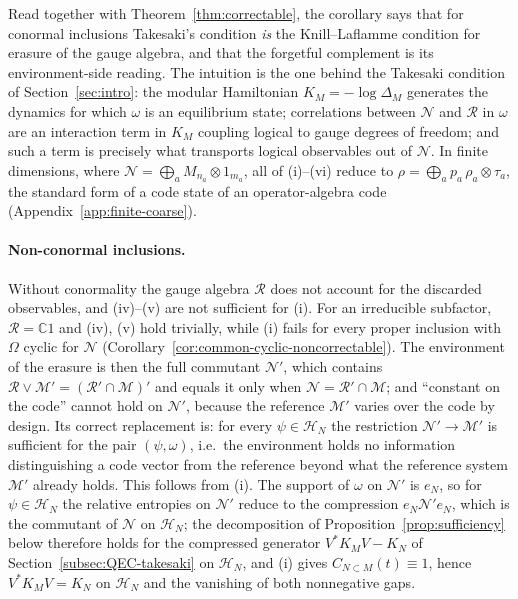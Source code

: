 \documentclass[a4paper,11pt]{article}
\theoremstyle{definition}
\begin{document}
Read together with Theorem~\ref{thm:correctable}, the corollary says that for conormal inclusions Takesaki's condition \emph{is} the Knill--Laflamme condition for erasure of the gauge algebra, and that the forgetful complement is its environment-side reading. The intuition is the one behind the Takesaki condition of Section~\ref{sec:intro}: the modular Hamiltonian $K_M=-\log\Delta_M$ generates the dynamics for which $\omega$ is an equilibrium state; correlations between $\mathcal N$ and $\mathcal R$ in $\omega$ are an interaction term in $K_M$ coupling logical to gauge degrees of freedom; and such a term is precisely what transports logical observables out of $\mathcal N$. In finite dimensions, where $\mathcal N=\bigoplus_aM_{n_a}\otimes1_{m_a}$, all of (i)--(vi) reduce to $\rho=\bigoplus_ap_a\,\rho_a\otimes\tau_a$, the standard form of a code state of an operator-algebra code (Appendix~\ref{app:finite-coarse}).

\paragraph{Non-conormal inclusions.}
Without conormality the gauge algebra $\mathcal R$ does not account for the discarded observables, and (iv)--(v) are not sufficient for (i). For an irreducible subfactor, $\mathcal R=\mathbb C1$ and (iv), (v) hold trivially, while (i) fails for every proper inclusion with $\Omega$ cyclic for $\mathcal N$ (Corollary~\ref{cor:common-cyclic-noncorrectable}). The environment of the erasure is then the full commutant $\mathcal N'$, which contains $\mathcal R\vee\mathcal M'=(\mathcal R'\cap\mathcal M)'$ and equals it only when $\mathcal N=\mathcal R'\cap\mathcal M$; and ``constant on the code'' cannot hold on $\mathcal N'$, because the reference $\mathcal M'$ varies over the code by design. Its correct replacement is: for every $\psi\in\mathcal H_N$ the restriction $\mathcal N'\to\mathcal M'$ is sufficient for the pair $(\psi,\omega)$, i.e.\ the environment holds no information distinguishing a code vector from the reference beyond what the reference system $\mathcal M'$ already holds. This follows from (i). The support of $\omega$ on $\mathcal N'$ is $e_N$, so for $\psi\in\mathcal H_N$ the relative entropies on $\mathcal N'$ reduce to the compression $e_N\mathcal N'e_N$, which is the commutant of $\mathcal N$ on $\mathcal H_N$; the decomposition of Proposition~\ref{prop:sufficiency} below therefore holds for the compressed generator $V^*K_MV-K_N$ of Section~\ref{subsec:QEC-takesaki} on $\mathcal H_N$, and (i) gives $C_{N\subset M}(t)\equiv1$, hence $V^*K_MV=K_N$ on $\mathcal H_N$ and the vanishing of both nonnegative gaps.
\end{document}
